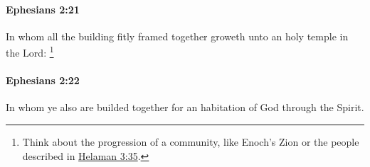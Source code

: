 		\paragraph{Ephesians 2:21} %
			\label{EPHESIANS-2-21}

			In whom all the building fitly framed together groweth unto an holy temple in the Lord:%
				\footnote{%
					Think about the progression of a community, like Enoch's Zion or the people described in \hyperref[HELAMAN-3-35]{Helaman 3:35}.
					}

			\begin{framed}
			\scriptsize
				\begin{compactdesc}
					\item[SBLG] 
				\end{compactdesc}
			\end{framed}

		\paragraph{Ephesians 2:22} %
			\label{EPHESIANS-2-22}

			In whom ye also are builded together for an habitation of God through the Spirit.

